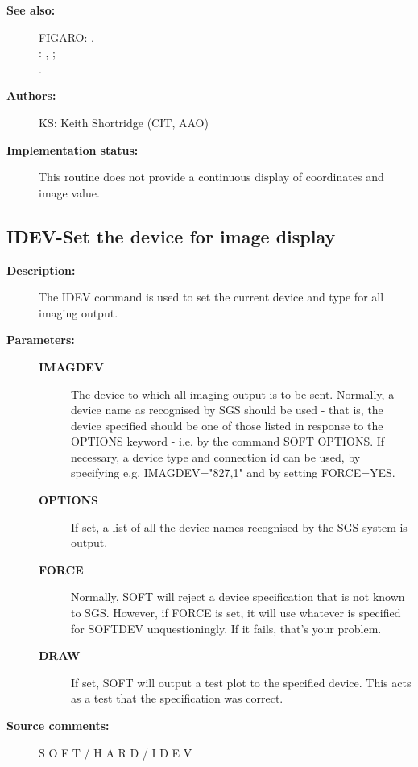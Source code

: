 \begin{description}
\begin{description}
\item [\textbf{See also:}]
FIGARO: .\\
: , ;\\
.\\

\item [\textbf{Authors:}]
 KS: Keith Shortridge (CIT, AAO)

\item [\textbf{Implementation status:}]
 This routine does not provide a continuous display of coordinates
 and image value.
\end{description}
\subsection{IDEV-\label{IDEV}Set the device for image display}
\begin{description}

\item [\textbf{Description:}]
 The IDEV command is used to set the current device
 and type for all imaging output.

\item [\textbf{Parameters:}]
\begin{description}
\item [\textbf{IMAGDEV}]
 The device to which all imaging output is to be
 sent. Normally, a device name as recognised by
 SGS  should be used - that is, the device specified
 should be one of those listed in response to the
 OPTIONS keyword - i.e. by the command SOFT OPTIONS.
 If necessary, a device type and connection id can
 be used, by specifying e.g. IMAGDEV="827,1" and by
 setting FORCE=YES.
\item [\textbf{OPTIONS}]
 If set, a list of all the device names recognised
 by the SGS system is output.
\item [\textbf{FORCE}]
 Normally, SOFT will reject a device specification
 that is not known to SGS.  However, if FORCE is
 set, it will use whatever is specified for SOFTDEV
 unquestioningly.  If it fails, that's your problem.
\item [\textbf{DRAW}]
 If set, SOFT will output a test plot to the
 specified device.  This acts as a test that
 the specification was correct.
\end{description}

\item [\textbf{Source comments:}]
\begin{terminalv}
 S O F T  /  H A R D  /  I D E V


\end{terminalv}
\end{description}
\end{description}
